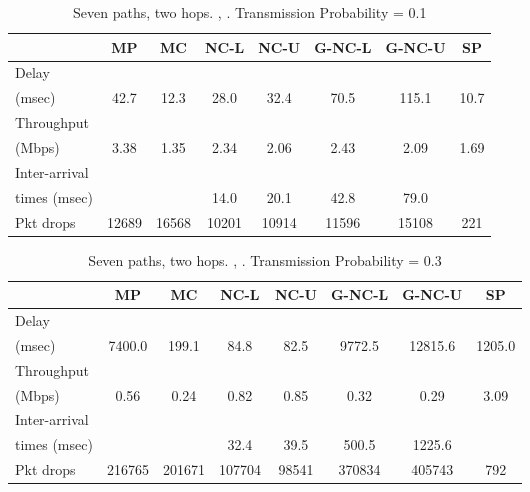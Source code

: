 \documentclass[journal, onecolumn, 12pt]{IEEEtran}
\begin{document}
\begin{table}[hb]
\begin{center}
\scriptsize
\begin{tabular}{|l|c|c|c|c|c|c|c|}
\hline
~                                   & MP & MC & NC-L & NC-U & G-NC-L & G-NC-U & SP \\ \hline
Delay           &   &   &  &  & & & \\
(msec)           & 42.7  & 12.3  & 28.0 & 32.4 & 70.5 & 115.1 & 10.7\\ \hline
Throughput             & ~  & ~  & ~    & ~    & ~           & ~           & ~  \\
(Mbps)                 & 3.38  & 1.35 & 2.34 & 2.06 & 2.43 & 2.09 & 1.69  \\ \hline
Inter-arrival             & ~  & ~  & ~    & ~    & ~           & ~           & ~  \\
times (msec)   &   &   &  14.0 & 20.1 & 42.8 &  79.0 &   \\ \hline
Pkt drops          & 12689  & 16568  & 10201 & 10914 & 11596 & 15108 & 221 \\ \hline
\end{tabular}
\end{center}
\caption {Seven paths, two hops. , . Transmission Probability = 0.1}
\label{tab:sim_topol_3_0.1}
\end{table}

\begin{table}[hb]
\begin{center}
\scriptsize
\begin{tabular}{|l|c|c|c|c|c|c|c|}
\hline
~                                   & MP & MC & NC-L & NC-U & G-NC-L & G-NC-U & SP \\ \hline
Delay           &   &   &  &  & & & \\
(msec)           & 7400.0  & 199.1  & 84.8 & 82.5 & 9772.5 & 12815.6 & 1205.0\\ \hline
Throughput             & ~  & ~  & ~    & ~    & ~           & ~           & ~  \\
(Mbps)                 & 0.56  & 0.24 &  0.82   & 0.85  & 0.32  & 0.29 & 3.09  \\ \hline
Inter-arrival             & ~  & ~  & ~    & ~    & ~           & ~           & ~  \\
times (msec)   &   &   &  32.4 & 39.5 &  500.5 &  1225.6 &   \\ \hline
Pkt drops          & 216765  & 201671  & 107704 & 98541 & 370834 & 405743 & 792 \\ \hline

\end{tabular}
\end{center}
\caption {Seven paths, two hops. , . Transmission Probability = 0.3}
\label{tab:sim_topol_3_0.3}
\end{table}
\end{document}

